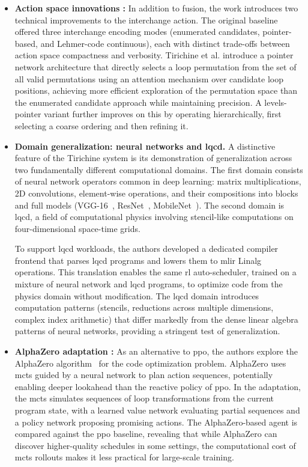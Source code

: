 \begin{itemize}
\item \textbf{Action space innovations :} In addition to fusion, the work introduces two technical improvements to the interchange action. The original baseline offered three interchange encoding modes (enumerated candidates, pointer-based, and Lehmer-code continuous), each with distinct trade-offs between action space compactness and verbosity. Tirichine et al. introduce a pointer network architecture that directly selects a loop permutation from the set of all valid permutations using an attention mechanism over candidate loop positions, achieving more efficient exploration of the permutation space than the enumerated candidate approach while maintaining precision. A levels-pointer variant further improves on this by operating hierarchically, first selecting a coarse ordering and then refining it.

\item \textbf{Domain generalization: neural networks and \gls{lqcd}.} A distinctive feature of the Tirichine system is its demonstration of generalization across two fundamentally different computational domains. The first domain consists of neural network operators common in deep learning: matrix multiplications, 2D convolutions, element-wise operations, and their compositions into blocks and full models (VGG-16~\cite{simonyan2015vgg}, ResNet~\cite{he2016resnet}, MobileNet~\cite{howard2019mobilenetv3}). The second domain is \gls{lqcd}, a field of computational physics involving stencil-like computations on four-dimensional space-time grids.

To support \gls{lqcd} workloads, the authors developed a dedicated compiler frontend that parses \gls{lqcd} programs and lowers them to \gls{mlir} Linalg operations. This translation enables the same \gls{rl} auto-scheduler, trained on a mixture of neural network and \gls{lqcd} programs, to optimize code from the physics domain without modification. The \gls{lqcd} domain introduces computation patterns (stencils, reductions across multiple dimensions, complex index arithmetic) that differ markedly from the dense linear algebra patterns of neural networks, providing a stringent test of generalization.

\item \textbf{AlphaZero adaptation :} As an alternative to \gls{ppo}, the authors explore the AlphaZero algorithm~\cite{silver2017alphazero} for the code optimization problem. AlphaZero uses  \gls{mcts} guided by a neural network to plan action sequences, potentially enabling deeper lookahead than the reactive policy of \gls{ppo}. In the adaptation, the \gls{mcts} simulates sequences of loop transformations from the current program state, with a learned value network evaluating partial sequences and a policy network proposing promising actions. The AlphaZero-based agent is compared against the \gls{ppo} baseline, revealing that while AlphaZero can discover higher-quality schedules in some settings, the computational cost of \gls{mcts} rollouts makes it less practical for large-scale training.


\end{itemize}
